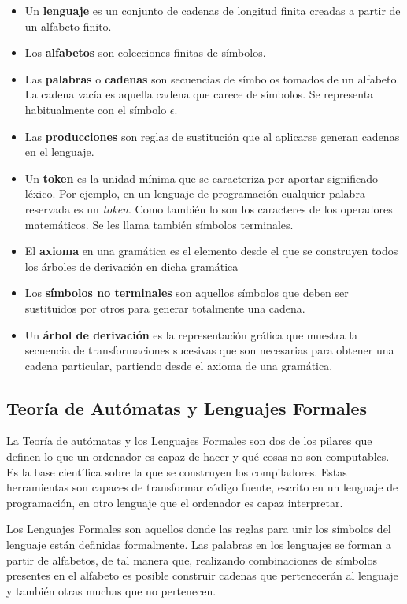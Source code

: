 \begin{itemize}
    \item Un \textbf{lenguaje} es un conjunto de cadenas de longitud finita creadas a partir de un alfabeto finito.
    \item Los \textbf{alfabetos} son colecciones finitas de símbolos.
    \item Las \textbf{palabras} o \textbf{cadenas} son secuencias de símbolos tomados de un alfabeto. La cadena vacía es aquella cadena que carece de símbolos. Se representa habitualmente con el símbolo $\epsilon$.
    \item Las \textbf{producciones} son reglas de sustitución que al aplicarse generan cadenas en el lenguaje.
    \item Un \textbf{token} es la unidad mínima que se caracteriza por aportar significado léxico. Por ejemplo, en un lenguaje de programación cualquier palabra reservada es un \emph{token}. Como también lo son los caracteres de los operadores matemáticos. Se les llama también símbolos terminales.
    \item El \textbf{axioma} en una gramática es el elemento desde el que se construyen todos los árboles de derivación en dicha gramática
    \item Los \textbf{símbolos no terminales} son aquellos símbolos que deben ser sustituidos por otros para generar totalmente una cadena.
    \item Un \textbf{árbol de derivación} es la representación gráfica que muestra la secuencia de transformaciones sucesivas que son necesarias para obtener una cadena particular, partiendo desde el axioma de una gramática.
\end{itemize}

\subsection{Teoría de Autómatas y Lenguajes Formales}

La Teoría de autómatas y los Lenguajes Formales son dos de los pilares que definen lo que un ordenador es capaz de hacer y qué cosas no son computables. Es la base científica sobre la que se construyen los compiladores. Estas herramientas son capaces de transformar código fuente, escrito en un lenguaje de programación, en otro lenguaje que el ordenador es capaz interpretar.


Los Lenguajes Formales son aquellos donde las reglas para unir los símbolos del lenguaje están definidas formalmente. Las palabras en los lenguajes se forman a partir de alfabetos, de tal manera que, realizando combinaciones de símbolos presentes en el alfabeto es posible construir cadenas que pertenecerán al lenguaje y también otras muchas que no pertenecen. 

